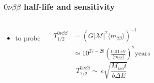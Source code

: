 \documentclass{beamer}
\begin{document}
	\begin{frame}
		\frametitle{$0\nu\beta\beta$ half-life and sensitivity}
		\begin{columns}[c] %
			
			\begin{itemize}
				\setlength\itemsep{2em}
				\item to probe
			\end{itemize}
			
			\begin{eqnarray*}
			T_{1/2}^{0\nu\beta\beta} &=\left(G|\mathcal{M}|^2 \langle m_{\beta\beta}\rangle\right)^{-1} \\
			& \simeq 10^{27-28} \left(\frac{0.01 \ eV}{\langle m_{\beta\beta}\rangle}\right)^2 \text{years}
			\end{eqnarray*}
			\begin{equation*}
			T_{1/2}^{0\nu\beta\beta} \sim \  \epsilon \sqrt{\frac{M_{iso} t}{b \Delta E}}
			\end{equation*}
			
		\end{columns}
	\end{frame}	
	
	
	
\end{document}
